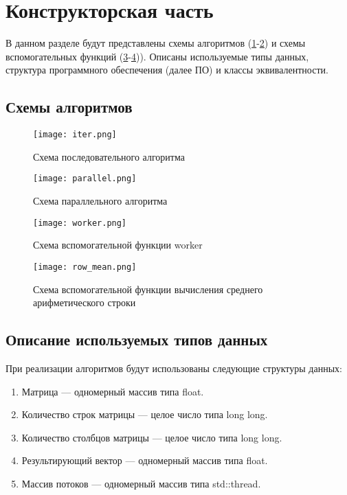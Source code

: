 \section{Конструкторская часть}

В данном разделе будут представлены схемы алгоритмов (\ref{img:iter}-\ref{img:parallel}) и схемы вспомогательных функций (\ref{img:worker}-\ref{img:row_mean})). Описаны используемые типы данных, структура программного обеспечения (далее ПО) и классы эквивалентности.

\subsection{Схемы алгоритмов}

\begin{figure}[H]
    \centering
    \texttt{[image: iter.png]}
    \caption{Схема последовательного алгоритма}
    \label{img:iter}
\end{figure}

\begin{figure}[H]
    \centering
    \texttt{[image: parallel.png]}
    \caption{Схема параллельного алгоритма}
    \label{img:parallel}
\end{figure}

\begin{figure}[H]
    \centering
    \texttt{[image: worker.png]}
    \caption{Схема вспомогательной функции worker}
    \label{img:worker}
\end{figure}

\begin{figure}[H]
    \centering
    \texttt{[image: row\_mean.png]}
    \caption{Схема вспомогательной функции вычисления среднего арифметического строки}
    \label{img:row_mean}
\end{figure}


\subsection{Описание используемых типов данных}

При реализации алгоритмов будут использованы следующие структуры данных:

\begin{enumerate}
	\item Матрица --- одномерный массив типа float.
	\item Количество строк матрицы --- целое число типа long long.
	\item Количество столбцов матрицы --- целое число типа long long.
	\item Результирующий вектор --- одномерный массив типа float.
	\item Массив потоков --- одномерный массив типа std::thread.
\end{enumerate}

